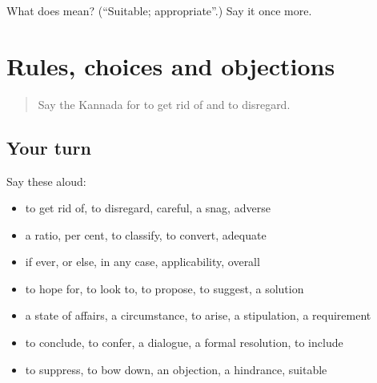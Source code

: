\begin{tcolorbox}[breakable,colback=teal!4,colframe=teal!35!black,title={Before you move on}]
What does  mean? (\textquotedblleft{}Suitable; appropriate\textquotedblright{}.) Say it once more.
\end{tcolorbox}
\section[(dialogue)]{Rules, choices and objections}

\label{lesson:KA-R432-review-426-432}



\begin{quote}
Say the Kannada for to get rid of and to disregard.
\end{quote}

\subsection*{Your turn}
Say these aloud:

\begin{itemize}
\raggedright
  \item to get rid of, to disregard, careful, a snag, adverse
  \item a ratio, per cent, to classify, to convert, adequate
  \item if ever, or else, in any case, applicability, overall
  \item to hope for, to look to, to propose, to suggest, a solution
  \item a state of affairs, a circumstance, to arise, a stipulation, a requirement
  \item to conclude, to confer, a dialogue, a formal resolution, to include
  \item to suppress, to bow down, an objection, a hindrance, suitable
\end{itemize}

